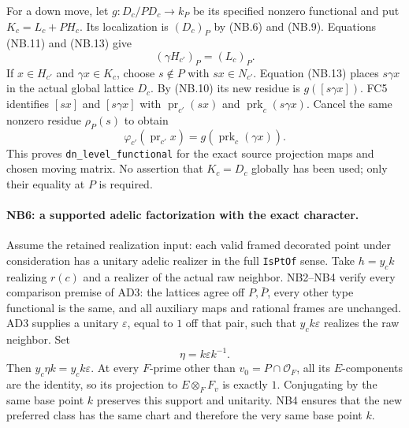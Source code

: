 For a down move, let $g:D_c/PD_c\to k_P$ be its specified nonzero
functional and put $K_c=L_c+PH_c$. Its localization is $(D_c)_P$
by (NB.6) and (NB.9). Equations (NB.11) and (NB.13) give
\[
                         (\gamma H_{c'})_P=(L_c)_P. \tag{NB.16}
\]
If $x\in H_{c'}$ and $\gamma x\in K_c$, choose $s\notin P$ with
$sx\in N_{c'}$. Equation (NB.13) places $s\gamma x$ in the actual
global lattice $D_c$. By (NB.10) its new residue is $g([s\gamma x])$.
FC5 identifies $[sx]$ and $[s\gamma x]$ with
$\operatorname{pr}_{c'}(sx)$ and $\operatorname{prk}_c(s\gamma x)$.
Cancel the same nonzero residue $\rho_P(s)$ to obtain
\[
 \varphi_{c'}(\operatorname{pr}_{c'}x)
                   =g(\operatorname{prk}_c(\gamma x)).           \tag{NB.17}
\]
This proves \texttt{dn\_level\_functional} for the exact source
projection maps and chosen moving matrix. No assertion that $K_c=D_c$
globally has been used; only their equality at $P$ is required.

\paragraph{NB6: a supported adelic factorization with the exact character.}
Assume the retained realization input: each valid framed decorated
point under consideration has a unitary adelic realizer in the full
\texttt{IsPtOf} sense. Take $h=y_ck$ realizing $r(c)$ and a realizer
of the actual raw neighbor. NB2--NB4 verify every comparison premise
of AD3: the lattices agree off $P,\bar P$, every other type functional
is the same, and all auxiliary maps and rational frames are unchanged.
AD3 supplies a unitary $\varepsilon$, equal to $1$ off that pair,
such that $y_ck\varepsilon$ realizes the raw neighbor. Set
\[
                         \eta=k\varepsilon k^{-1}. \tag{NB.18}
\]
Then $y_c\eta k=y_ck\varepsilon$. At every $F$-prime other than
$v_0=P\cap\mathcal O_F$, all its $E$-components are the identity,
so its projection to $E\otimes_FF_v$ is exactly $1$.
Conjugating by the same base point $k$ preserves this support and
unitarity. NB4 ensures that the new preferred class has the same
chart and therefore the very same base point $k$.

